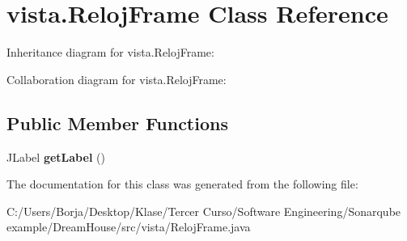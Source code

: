 \hypertarget{classvista_1_1_reloj_frame}{}\section{vista.\+Reloj\+Frame Class Reference}
\label{classvista_1_1_reloj_frame}


Inheritance diagram for vista.\+Reloj\+Frame\+:


Collaboration diagram for vista.\+Reloj\+Frame\+:
\subsection*{Public Member Functions}
\begin{DoxyCompactItemize}
\item 
\mbox{\label{classvista_1_1_reloj_frame_a265ed4e08edcc3d106a9e64448e65abe}} 
J\+Label {\bfseries get\+Label} ()
\end{DoxyCompactItemize}


The documentation for this class was generated from the following file\+:\begin{DoxyCompactItemize}
\item 
C\+:/\+Users/\+Borja/\+Desktop/\+Klase/\+Tercer Curso/\+Software Engineering/\+Sonarqube example/\+Dream\+House/src/vista/Reloj\+Frame.\+java\end{DoxyCompactItemize}
